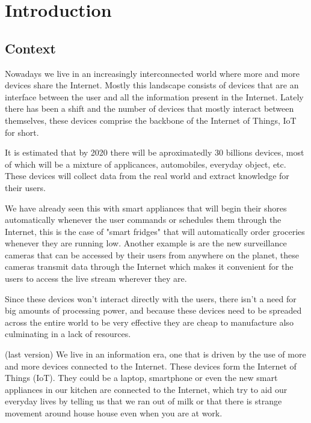\chapter{Introduction}
\label{chap:intro}

\section{Context}
\label{sec:context} %
Nowadays we live in an increasingly interconnected world where more and more
devices share the Internet. Mostly this landscape consists of devices that are
an interface between the user and all the information present in the Internet.
Lately there has been a shift and the number of devices that mostly interact
between themselves, these devices comprise the backbone of the Internet of
Things, IoT for short.

It is estimated that by 2020 there will be aproximatedly 30 billions devices,
most of which will be a mixture of applicances, automobiles, everyday object,
etc. These devices will collect data from the real world and extract knowledge
for their users.

We have already seen this with smart appliances that will begin their shores
automatically whenever the user commands or schedules them through the Internet,
this is the case of "smart fridges" that will automatically order groceries
whenever they are running low. Another example is are the new surveillance
cameras that can be accessed by their users from anywhere on the planet, these
cameras transmit data through the Internet which makes it convenient for the
users to access the live stream wherever they are.

Since these devices won't interact directly with the users, there isn't a need
for big amounts of processing power, and because these devices need to be
spreaded across the entire world to be very effective they are cheap to
manufacture also culminating in a lack of resources.

(last version)
We live in an information era, one that is driven by the use of more and more
devices connected to the Internet. These devices form the Internet of Things
(IoT). They could be a laptop, smartphone or even the new smart appliances in
our kitchen are connected to the Internet, which try to aid our everyday lives
by telling us that we ran out of milk or that there is strange movement around
house house even when you are at work.

